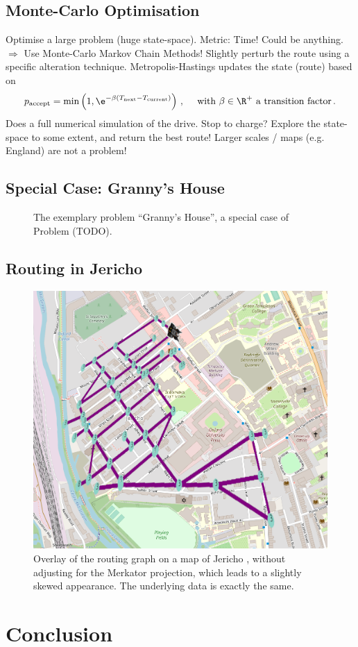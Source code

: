 \documentclass[12pt, a4paper]{article}
\begin{document}
  \subsection{Monte-Carlo Optimisation}
  Optimise a large problem (huge state-space). Metric: Time! Could be anything.
  $\Rightarrow$ Use Monte-Carlo Markov Chain Methods!
  Slightly perturb the route using a specific alteration technique.
  Metropolis-Hastings updates the state (route) based on $$p_{\rm accept} = \min\left(1, \e^{-\beta (T_{\rm next} - T_{\rm current})}\right)\,, \quad \text{ with } \beta \in \R^+ \text{ a transition factor} \,.$$
  Does a full numerical simulation of the drive. Stop to charge?
  Explore the state-space to some extent, and return the best route!
  Larger scales / maps (e.g. England) are not a problem!

  \subsection{Special Case: Granny's House}
  \begin{figure}[H]
    \centering
    \caption{The exemplary problem ``Granny's House'', a special case of Problem (TODO).}
  \end{figure}

  \subsection{Routing in Jericho}
  \begin{figure}[H]
    \centering
    \includegraphics[width=0.6\linewidth]{figures/jericho.png}
    \caption{Overlay of the routing graph on a map of Jericho \parencite{OpenStreetMap}, without adjusting for the Merkator projection, which leads to a slightly skewed appearance. The underlying data is exactly the same.}
  \end{figure}

  \section{Conclusion}

  \pagebreak
  \printbibliography
\end{document}
